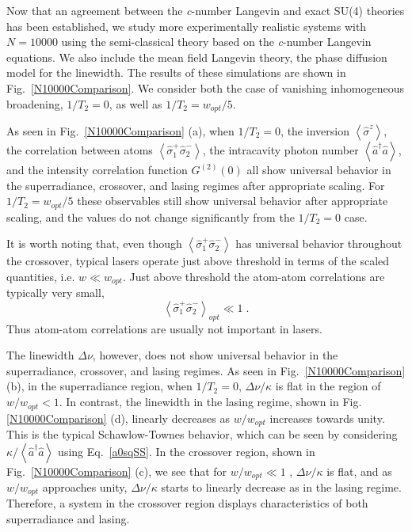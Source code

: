 \documentclass[aps,
twocolumn,
superscriptaddress,groupedaddress]{revtex4}
\begin{document}
{Now that an agreement between the {\it c}-number Langevin and exact
SU(4) theories has been established, we study more experimentally
realistic systems with $N=10000$ using the semi-classical theory based
on the {\it c}-number Langevin equations. We also include the mean field
Langevin theory, the phase diffusion model for the linewidth. The
results of these simulations are shown in Fig.~\ref{N10000Comparison}.
We consider both the case of vanishing inhomogeneous broadening,
$1/T_2=0$, as well as $1/T_2=w_{opt}/5$.

As seen in Fig.~\ref{N10000Comparison} (a), when $1/T_2=0$, the
inversion $\left<\hat{\sigma}^{z}\right>$, the correlation between atoms
$\left<\hat{\sigma}_{1}^{+} \hat{\sigma}_{2}^{-}\right>$, the
intracavity photon number  $\left<\hat{a}^{\dagger}\hat{a}\right>$,  and
the intensity correlation function $G^{(2)}(0)$ all show universal
behavior in the superradiance, crossover, and lasing regimes after
appropriate scaling.  For $1/T_2=w_{opt}/5$ these observables still show
universal behavior after appropriate scaling, and the values do not
change significantly from the $1/T_2=0$ case.

It is worth noting that, even though  $\left<\hat{\sigma}_{1}^{+}
\hat{\sigma}_{2}^{-}\right>$ has universal behavior throughout the
crossover, typical lasers operate just above threshold in terms of the
scaled quantities, i.e. $w \ll w_{opt}$.  Just above threshold the
atom-atom correlations are typically very small,
\begin{equation}
\left<\hat{\sigma}_{1}^{+}\hat{\sigma}_{2}^{-}\right>_{opt} \ll 1\;.
\end{equation}
Thus atom-atom correlations are usually not important in lasers.

The linewidth $\Delta \nu$, however, does not show universal behavior in
the superradiance, crossover, and lasing regimes. As seen in
Fig.~\ref{N10000Comparison} (b), in the superradiance region, when
$1/T_2=0$, $\Delta \nu / \kappa$ is flat in the region of $w/w_{opt}<1$.
In contrast, the linewidth in the lasing regime, shown in
Fig.\ref{N10000Comparison} (d), linearly decreases as $w/w_{opt}$
increases towards unity. This is the typical Schawlow-Townes behavior,
which can be seen by considering
$\kappa/\left<\hat{a}^{\dagger}\hat{a}\right>$ using Eq.~\ref{a0sqSS}.
In the crossover region, shown in Fig.~\ref{N10000Comparison} (c), we
see that for $w/w_{opt}\ll 1$ , $\Delta \nu/\kappa$ is flat, and as
$w/w_{opt}$ approaches unity, $\Delta \nu/\kappa$ starts to linearly
decrease as in the lasing regime. Therefore, a system in the crossover
region displays characteristics of both superradiance and lasing. 

}
\end{document}
